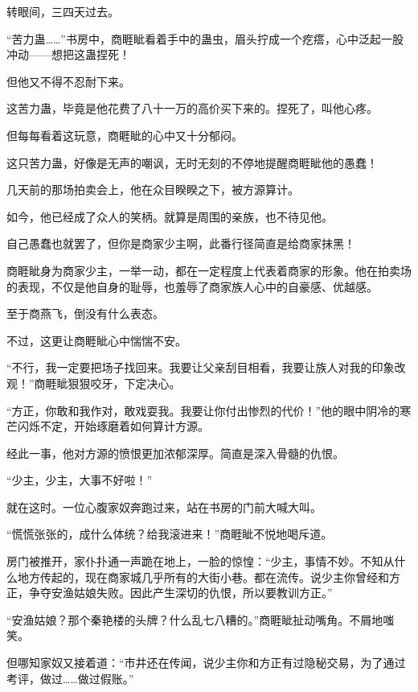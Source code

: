 
\begin{this_body}

转眼间，三四天过去。

“苦力蛊……”书房中，商睚眦看着手中的蛊虫，眉头拧成一个疙瘩，心中泛起一股冲动——想把这蛊捏死！

但他又不得不忍耐下来。

这苦力蛊，毕竟是他花费了八十一万的高价买下来的。捏死了，叫他心疼。

但每每看着这玩意，商睚眦的心中又十分郁闷。

这只苦力蛊，好像是无声的嘲讽，无时无刻的不停地提醒商睚眦他的愚蠢！

几天前的那场拍卖会上，他在众目睽睽之下，被方源算计。

如今，他已经成了众人的笑柄。就算是周围的亲族，也不待见他。

自己愚蠢也就罢了，但你是商家少主啊，此番行径简直是给商家抹黑！

商睚眦身为商家少主，一举一动，都在一定程度上代表着商家的形象。他在拍卖场的表现，不仅是他自身的耻辱，也羞辱了商家族人心中的自豪感、优越感。

至于商燕飞，倒没有什么表态。

不过，这更让商睚眦心中惴惴不安。

“不行，我一定要把场子找回来。我要让父亲刮目相看，我要让族人对我的印象改观！”商睚眦狠狠咬牙，下定决心。

“方正，你敢和我作对，敢戏耍我。我要让你付出惨烈的代价！”他的眼中阴冷的寒芒闪烁不定，开始琢磨着如何算计方源。

经此一事，他对方源的愤恨更加浓郁深厚。简直是深入骨髓的仇恨。

“少主，少主，大事不好啦！”

就在这时。一位心腹家奴奔跑过来，站在书房的门前大喊大叫。

“慌慌张张的，成什么体统？给我滚进来！”商睚眦不悦地喝斥道。

房门被推开，家仆扑通一声跪在地上，一脸的惊惶：“少主，事情不妙。不知从什么地方传起的，现在商家城几乎所有的大街小巷。都在流传。说少主你曾经和方正，争夺安渔姑娘失败。因此产生深切的仇恨，所以要教训方正。”

“安渔姑娘？那个秦艳楼的头牌？什么乱七八糟的。”商睚眦扯动嘴角。不屑地嗤笑。

但哪知家奴又接着道：“市井还在传闻，说少主你和方正有过隐秘交易，为了通过考评，做过……做过假账。”


\end{this_body}
